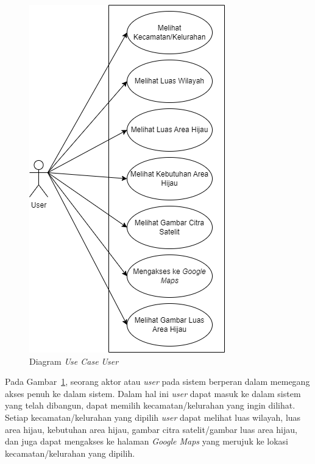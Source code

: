 \begin{figure}[H]
	\centering
	\includegraphics[scale=0.5]{Gambar/UseCaseUser.png}
	\caption[Diagram \textit{Use Case} \textit{User}]{Diagram \textit{Use Case} \textit{User}}
	\label{fig:useCaseUser}
\end{figure}

Pada Gambar~\ref{fig:useCaseUser}, seorang aktor atau \textit{user} pada sistem berperan dalam memegang akses penuh ke dalam sistem. Dalam hal ini \textit{user} dapat masuk ke dalam sistem yang telah dibangun, dapat memilih kecamatan/kelurahan yang ingin dilihat. Setiap kecamatan/kelurahan yang dipilih \textit{user} dapat melihat luas wilayah, luas area hijau, kebutuhan area hijau, gambar citra satelit/gambar luas area hijau, dan juga dapat mengakses ke halaman \textit{Google Maps} yang merujuk ke lokasi kecamatan/kelurahan yang dipilih.
	
